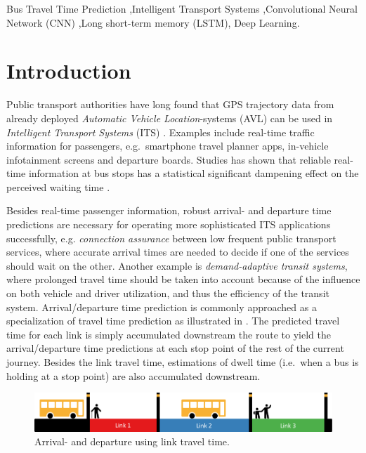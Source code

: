 \documentclass[preprint,11pt,5p,twocolumn]{elsarticle}
\begin{document}
\begin{frontmatter}
\begin{keyword}
Bus Travel Time Prediction \sep Intelligent Transport Systems \sep Convolutional Neural Network (CNN) \sep Long short-term memory (LSTM), Deep Learning.
\end{keyword}

\end{frontmatter}
\section{Introduction}
Public transport authorities have long found that GPS trajectory data from already deployed \emph{Automatic Vehicle Location}-systems (AVL) can be used in \emph{Intelligent Transport Systems} (ITS) \cite{Tcrp48}. Examples include real-time traffic information for passengers, e.g.\ smartphone travel planner apps, in-vehicle infotainment screens and departure boards. Studies has shown that reliable real-time information at bus stops has a statistical significant dampening effect on the perceived waiting time \cite{Fan2016}.

Besides real-time passenger information, robust arrival- and departure time predictions are necessary for operating more sophisticated ITS applications successfully, e.g. \emph{connection assurance} between low frequent public transport services, where accurate arrival times are needed to decide if one of the services should wait on the other. Another example is \emph{demand-adaptive transit systems}, where prolonged travel time should be taken into account because of the influence on both vehicle and driver utilization, and thus the efficiency of the transit system. Arrival/departure time prediction is commonly approached as a specialization of travel time prediction as illustrated in . The predicted travel time for each link is simply accumulated downstream the route to yield the arrival/departure time predictions at each stop point of the rest of the current journey. Besides the link travel time, estimations of dwell time (i.e.\ when a bus is holding at a stop point) are also accumulated downstream.

\begin{figure}[!ht]
  \center  
  \includegraphics[width=\columnwidth]{drawings/bus-arrival-links-narrow.pdf}
  \caption{Arrival- and departure using link travel time.}
  \label{fig:bus-arrival-links}
\end{figure}
\end{document}
